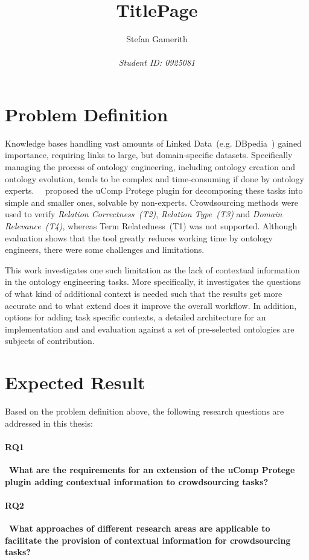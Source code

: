 \documentclass[12pt, notitlepage]{article}
\title{TitlePage}
\author{Stefan Gamerith\\\\
		\emph{Student ID: 0925081}}
\begin{document}
	\maketitle
	\thispagestyle{empty}
	\newpage
\setcounter{page}{1}

\section{Problem Definition}
Knowledge bases handling vast amounts of Linked Data~(e.g. DBpedia~\cite{lehmann2015dbpedia}) gained importance, requiring links to large, but domain-specific datasets. Specifically managing the process of ontology engineering, including ontology creation and ontology evolution, tends to be complex and time-consuming if done by ontology experts.
\citeauthor{wohlgenannt2016crowd}~\cite{wohlgenannt2016crowd}~proposed the uComp Protege plugin for decomposing these tasks into simple and smaller ones, solvable by non-experts. Crowdsourcing methods were used to verify \textit{Relation Correctness~(T2)}, \textit{Relation Type~(T3)} and \textit{Domain Relevance~(T4)}, whereas Term Relatedness~(T1) was not supported. Although evaluation shows that the tool greatly reduces working time by ontology engineers, there were some challenges and limitations. 

This work investigates one such limitation as the lack of contextual information in the ontology engineering tasks. More specifically, it investigates the questions of what kind of additional context is needed such that the results get more accurate and to what extend does it improve the overall workflow. In addition, options for adding task specific contexts, a detailed architecture for an implementation and and evaluation against a set of pre-selected ontologies are subjects of contribution. 
\section{Expected Result}
Based on the problem definition above, the following research questions are addressed in this thesis:
\paragraph{RQ1}~\textbf{What are the requirements for an extension of the uComp Protege plugin adding contextual information to crowdsourcing tasks?}\\
\paragraph{RQ2}~\textbf{What approaches of different research areas are applicable to facilitate the provision of contextual information for crowdsourcing tasks?}\\
\end{document}
